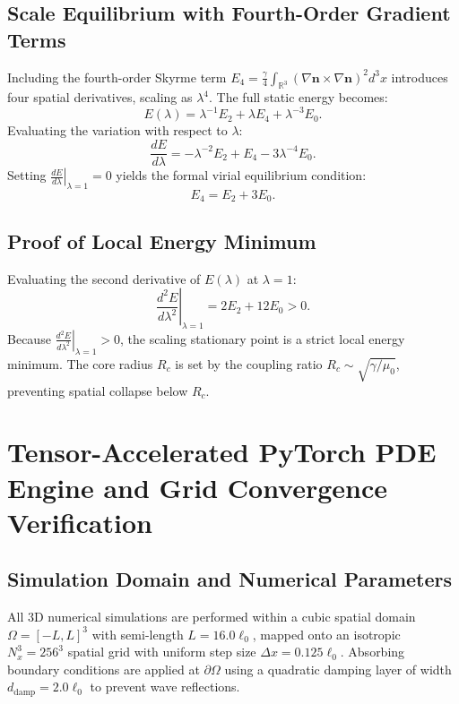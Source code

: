 \documentclass[11pt,a4paper]{article}
\begin{document}
	\subsection{Scale Equilibrium with Fourth-Order Gradient Terms}
	Including the fourth-order Skyrme term $E_4 = \frac{\gamma}{4} \int_{\mathbb{R}^3} (\nabla \mathbf{n} \times \nabla \mathbf{n})^2 d^3x$ introduces four spatial derivatives, scaling as $\lambda^4$. The full static energy becomes:
	\begin{equation}
		E(\lambda) = \lambda^{-1} E_2 + \lambda E_4 + \lambda^{-3} E_0.
		\label{eq:full_scaling_energy}
	\end{equation}
	Evaluating the variation with respect to $\lambda$:
	\begin{equation}
		\frac{dE}{d\lambda} = -\lambda^{-2} E_2 + E_4 - 3\lambda^{-4} E_0.
		\label{eq:dE_dlambda}
	\end{equation}
	Setting $\left. \frac{dE}{d\lambda} \right|_{\lambda=1} = 0$ yields the formal virial equilibrium condition:
	\begin{equation}
		E_4 = E_2 + 3 E_0.
		\label{eq:virial_equilibrium}
	\end{equation}
	
	\subsection{Proof of Local Energy Minimum}
	Evaluating the second derivative of $E(\lambda)$ at $\lambda = 1$:
	\begin{equation}
		\left. \frac{d^2E}{d\lambda^2} \right|_{\lambda=1} = 2 E_2 + 12 E_0 > 0.
		\label{eq:second_derivative_min}
	\end{equation}
	Because $\left. \frac{d^2E}{d\lambda^2} \right|_{\lambda=1} > 0$, the scaling stationary point is a strict local energy minimum. The core radius $R_c$ is set by the coupling ratio $R_c \sim \sqrt{\gamma / \mu_0}$, preventing spatial collapse below $R_c$.
	
	\section{Tensor-Accelerated PyTorch PDE Engine and Grid Convergence Verification}
	\label{sec:numerical_engine}
	
	\subsection{Simulation Domain and Numerical Parameters}
	All 3D numerical simulations are performed within a cubic spatial domain $\Omega = [-L, L]^3$ with semi-length $L = 16.0 \ell_0$, mapped onto an isotropic $N_x^3 = 256^3$ spatial grid with uniform step size $\Delta x = 0.125 \ell_0$. Absorbing boundary conditions are applied at $\partial \Omega$ using a quadratic damping layer of width $d_{\text{damp}} = 2.0 \ell_0$ to prevent wave reflections.
	
\end{document}
